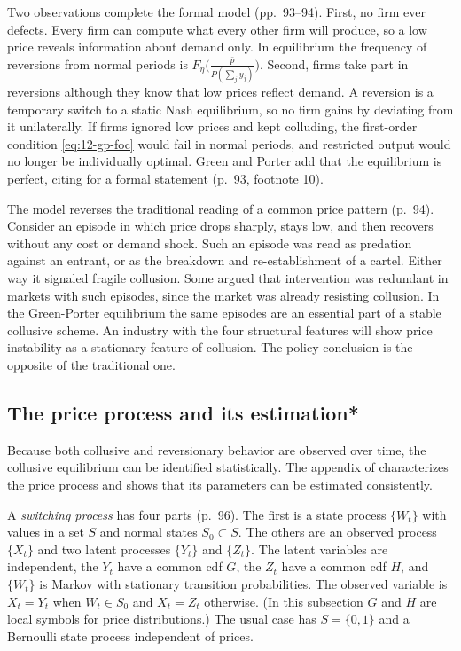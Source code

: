 Two observations complete the formal model (pp.~93--94). First, no firm ever defects. Every firm can compute what
every other firm will produce, so a low price reveals information about demand only. In equilibrium the frequency
of reversions from normal periods is $F_\eta\bigl(\frac{\bar p}{P(\sum_j y_j)}\bigr)$. Second, firms take part in
reversions although they know that low prices reflect demand. A reversion is a temporary switch to a static Nash
equilibrium, so no firm gains by deviating from it unilaterally. If firms ignored low prices and kept colluding, the
first-order condition \eqref{eq:12-gp-foc} would fail in normal periods, and restricted output would no longer be
individually optimal. Green and Porter add that the equilibrium is perfect, citing \citet{Green1980} for a formal
statement (p.~93, footnote 10).

The model reverses the traditional reading of a common price pattern (p.~94). Consider an episode in which price
drops sharply, stays low, and then recovers without any cost or demand shock. Such an episode was read as predation
against an entrant, or as the breakdown and re-establishment of a cartel. Either way it signaled fragile collusion. Some
argued that intervention was redundant in markets with such episodes, since the market was already resisting
collusion. In the Green-Porter equilibrium the same episodes are an essential part of a stable collusive scheme. An
industry with the four structural features will show price instability as a stationary feature of collusion. The
policy conclusion is the opposite of the traditional one.

\subsection{The price process and its estimation*}\label{sec:12-gp-process}

Because both collusive and reversionary behavior are observed over time, the collusive equilibrium can be
identified statistically. The appendix of \citet{GreenPorter1984} characterizes the price process and shows that its
parameters can be estimated consistently.

A \emph{switching process} has four parts (p.~96). The first is a state process $\{W_t\}$ with values in a set $S$
and normal states $S_0 \subset S$. The others are an observed process $\{X_t\}$ and two latent processes $\{Y_t\}$
and $\{Z_t\}$. The
latent variables are independent, the $Y_t$ have a common cdf $G$, the $Z_t$ have a common cdf $H$, and $\{W_t\}$ is
Markov with stationary transition probabilities. The observed variable is $X_t = Y_t$ when $W_t \in S_0$ and
$X_t = Z_t$ otherwise. (In this subsection $G$ and $H$ are local symbols for price distributions.) The usual case has
$S = \{0, 1\}$ and a Bernoulli state process independent of prices.

